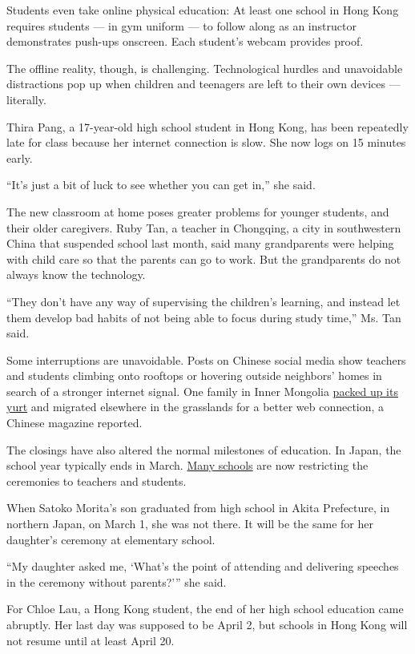 Students even take online physical education: At least one school in
Hong Kong requires students --- in gym uniform --- to follow along as an
instructor demonstrates push-ups onscreen. Each student's webcam
provides proof.

The offline reality, though, is challenging. Technological hurdles and
unavoidable distractions pop up when children and teenagers are left to
their own devices --- literally.

Thira Pang, a 17-year-old high school student in Hong Kong, has been
repeatedly late for class because her internet connection is slow. She
now logs on 15 minutes early.

``It's just a bit of luck to see whether you can get in,'' she said.

The new classroom at home poses greater problems for younger students,
and their older caregivers. Ruby Tan, a teacher in Chongqing, a city in
southwestern China that suspended school last month, said many
grandparents were helping with child care so that the parents can go to
work. But the grandparents do not always know the technology.

``They don't have any way of supervising the children's learning, and
instead let them develop bad habits of not being able to focus during
study time,'' Ms. Tan said.

Some interruptions are unavoidable. Posts on Chinese social media show
teachers and students climbing onto rooftops or hovering outside
neighbors' homes in search of a stronger internet signal. One family in
Inner Mongolia \href{https://m.weibo.cn/status/4478077407118555?}{packed
up its yurt} and migrated elsewhere in the grasslands for a better web
connection, a Chinese magazine reported.

The closings have also altered the normal milestones of education. In
Japan, the school year typically ends in March.
\href{https://www.nytimes3xbfgragh.onion/2020/02/27/world/asia/japan-schools-coronavirus.html}{Many
schools} are now restricting the ceremonies to teachers and students.

When Satoko Morita's son graduated from high school in Akita Prefecture,
in northern Japan, on March 1, she was not there. It will be the same
for her daughter's ceremony at elementary school.

``My daughter asked me, `What's the point of attending and delivering
speeches in the ceremony without parents?''' she said.

For Chloe Lau, a Hong Kong student, the end of her high school education
came abruptly. Her last day was supposed to be April 2, but schools in
Hong Kong will not resume until at least April 20.

